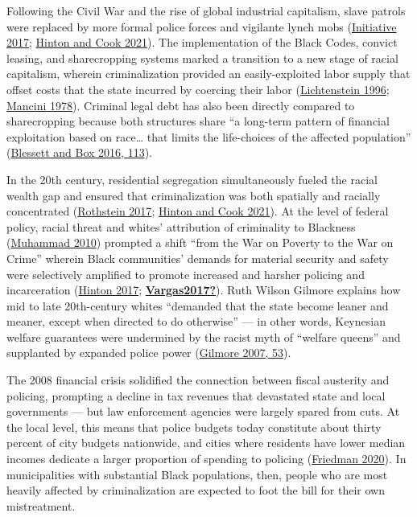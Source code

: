 \documentclass[
  12pt,
]{article}
\begin{document}
Following the Civil War and the rise of global industrial capitalism, slave patrols were replaced by more formal police forces and vigilante lynch mobs (\protect\hyperlink{ref-EqualJusticeInitiative2017}{Initiative 2017}; \protect\hyperlink{ref-Hinton2021}{Hinton and Cook 2021}). The implementation of the Black Codes, convict leasing, and sharecropping systems marked a transition to a new stage of racial capitalism, wherein criminalization provided an easily-exploited labor supply that offset costs that the state incurred by coercing their labor (\protect\hyperlink{ref-Lichtenstein1996}{Lichtenstein 1996}; \protect\hyperlink{ref-Mancini1978}{Mancini 1978}). Criminal legal debt has also been directly compared to sharecropping because both structures share ``a long-term pattern of financial exploitation based on race\ldots{} that limits the life-choices of the affected population'' (\protect\hyperlink{ref-Blessett2016}{Blessett and Box 2016, 113}).

In the 20th century, residential segregation simultaneously fueled the racial wealth gap and ensured that criminalization was both spatially and racially concentrated (\protect\hyperlink{ref-Rothstein2017}{Rothstein 2017}; \protect\hyperlink{ref-Hinton2021}{Hinton and Cook 2021}). At the level of federal policy, racial threat and whites' attribution of criminality to Blackness (\protect\hyperlink{ref-Muhammad2010}{Muhammad 2010}) prompted a shift ``from the War on Poverty to the War on Crime'' wherein Black communities' demands for material security and safety were selectively amplified to promote increased and harsher policing and incarceration (\protect\hyperlink{ref-Hinton2017}{Hinton 2017}; \protect\hyperlink{ref-Vargas2017}{\textbf{Vargas2017?}}). Ruth Wilson Gilmore explains how mid to late 20th-century whites ``demanded that the state become leaner and meaner, except when directed to do otherwise'' --- in other words, Keynesian welfare guarantees were undermined by the racist myth of ``welfare queens'' and supplanted by expanded police power (\protect\hyperlink{ref-Gilmore2007}{Gilmore 2007, 53}).

The 2008 financial crisis solidified the connection between fiscal austerity and policing, prompting a decline in tax revenues that devastated state and local governments --- but law enforcement agencies were largely spared from cuts. At the local level, this means that police budgets today constitute about thirty percent of city budgets nationwide, and cities where residents have lower median incomes dedicate a larger proportion of spending to policing (\protect\hyperlink{ref-Friedman2020}{Friedman 2020}). In municipalities with substantial Black populations, then, people who are most heavily affected by criminalization are expected to foot the bill for their own mistreatment.
\end{document}
